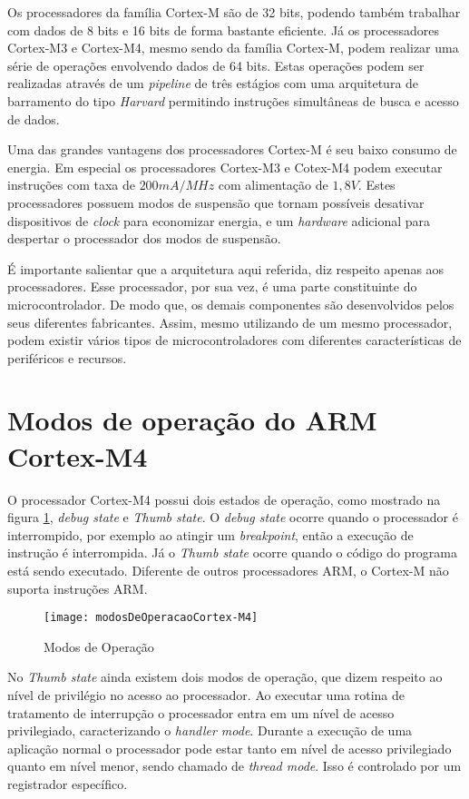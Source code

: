 Os processadores da família Cortex-M são de 32 bits, podendo também trabalhar com dados de 8 bits e 16 bits de forma bastante eficiente. Já os processadores Cortex-M3  e Cortex-M4, mesmo sendo da família Cortex-M, podem realizar uma série de operações envolvendo dados de 64 bits. Estas operações podem ser realizadas através de um \emph{pipeline} de três estágios com uma arquitetura de barramento do tipo \emph{Harvard} permitindo instruções simultâneas de busca e acesso de dados.

Uma das grandes vantagens dos processadores Cortex-M é seu baixo consumo de energia. Em especial os processadores Cortex-M3 e Cotex-M4 podem executar instruções com taxa de $200 mA/MHz$ com alimentação de $1,8 V$. Estes processadores possuem modos de suspensão que tornam possíveis desativar dispositivos de \emph{clock} para economizar energia, e um \emph{hardware} adicional para despertar o processador dos modos de suspensão.

É importante salientar que a arquitetura aqui referida, diz respeito apenas aos processadores. Esse processador, por sua vez, é uma parte constituinte do microcontrolador. De modo que, os demais componentes são desenvolvidos pelos seus diferentes fabricantes. Assim, mesmo utilizando de um mesmo processador, podem existir vários tipos de microcontroladores com diferentes características de periféricos e recursos.


\section{Modos de operação do ARM Cortex-M4}

O processador Cortex-M4 possui dois estados de operação, como mostrado na figura \ref{fig:modosDeOperacao}, \emph{debug state} e \emph{Thumb state}. O \emph{debug state} ocorre quando o processador é interrompido, por exemplo ao atingir um \emph{breakpoint}, então a execução de instrução é interrompida. Já o \emph{Thumb state} ocorre quando o código do programa está sendo executado. Diferente de outros processadores ARM, o Cortex-M não suporta instruções ARM.

\begin{figure}[H]
	\centering
	\texttt{[image: modosDeOperacaoCortex-M4]}
	\caption{Modos de Operação \cite{DATASHEET_TIVA}}
	\label{fig:modosDeOperacao}
\end{figure}

No \emph{Thumb state} ainda existem dois modos de operação, que dizem respeito ao nível de privilégio no acesso ao processador. Ao executar uma rotina de tratamento de interrupção o processador entra em um nível de acesso privilegiado, caracterizando o \emph{handler mode}. Durante a execução de uma aplicação normal o processador pode estar tanto em nível de acesso privilegiado quanto em nível menor, sendo chamado de \emph{thread mode}. Isso é controlado por um registrador específico. 

